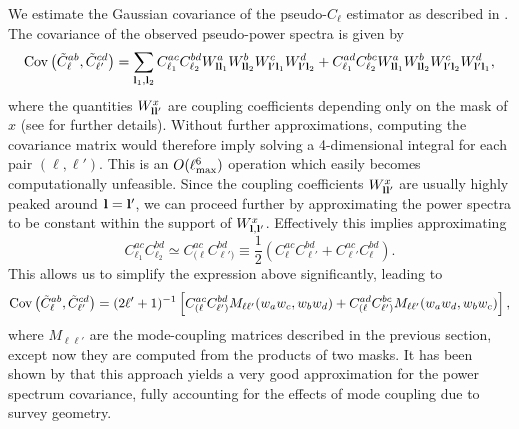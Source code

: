 \documentclass[a4paper,11pt]{article}
\begin{document}
    We estimate the Gaussian covariance of the pseudo-$C_\ell$ estimator as described in \cite{2004MNRAS.349..603E,2019arXiv190611765G}. The covariance of the observed pseudo-power spectra is given by
    \begin{equation}
      {\rm Cov}\left(\tilde{C}^{ab}_\ell,\tilde{C}^{cd}_{\ell'}\right)=\sum_{{\bf l}_1,{\bf l}_2} C^{ac}_{\ell_1}C^{bd}_{\ell_2}W^a_{{\bf l}{\bf l}_1}W^b_{{\bf l}{\bf l}_2}W^c_{{\bf l}'{\bf l}_1}W^d_{{\bf l}'{\bf l}_2} + C^{ad}_{\ell_1}C^{bc}_{\ell_2}W^a_{{\bf l}{\bf l}_1}W^b_{{\bf l}{\bf l}_2}W^c_{{\bf l}'{\bf l}_2}W^d_{{\bf l}'{\bf l}_1},
    \end{equation}
    where the quantities $W^x_{{\bf l}{\bf l}'}$ are coupling coefficients depending only on the mask of $x$ (see \cite{2019arXiv190611765G} for further details). Without further approximations, computing the covariance matrix would therefore imply solving a 4-dimensional integral for each pair $(\ell,\ell')$. This is an $O(\ell_{\rm max}^6)$ operation which easily becomes computationally unfeasible. Since the coupling coefficients $W^x_{{\bf l}{\bf l}'}$ are usually highly peaked around ${\bf l}={\bf l}'$, we can proceed further by approximating the power spectra to be constant within the support of $W^x_{{\bf l},{\bf l}'}$. Effectively this implies approximating
    \begin{equation}
      C^{ac}_{\ell_1}C^{bd}_{\ell_2}\simeq C^{ac}_{(\ell}C^{bd}_{\ell')}\equiv\frac{1}{2}\left(C^{ac}_\ell C^{bd}_{\ell'}+C^{ac}_{\ell'} C^{bd}_\ell\right).
    \end{equation}
    This allows us to simplify the expression above significantly, leading to
    \begin{equation}
      {\rm Cov}\left(\tilde{C}^{ab}_\ell,\tilde{C}^{cd}_{\ell'}\right)=(2\ell'+1)^{-1}\left[C^{ac}_{(\ell}C^{bd}_{\ell')}M_{\ell\ell'}(w_aw_c,w_bw_d)+C^{ad}_{(\ell}C^{bc}_{\ell')}M_{\ell\ell'}(w_aw_d,w_bw_c)\right],
    \end{equation}
    where $M_{\ell\ell'}$ are the mode-coupling matrices described in the previous section, except now they are computed from the products of two masks. It has been shown by \cite{2019arXiv190611765G} that this approach yields a very good approximation for the power spectrum covariance, fully accounting for the effects of mode coupling due to survey geometry.
\end{document}
